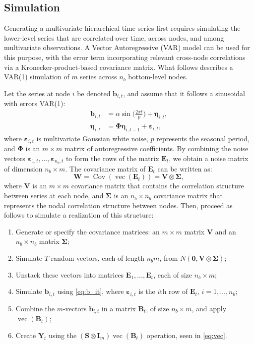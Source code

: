 \documentclass[a4paper,preprint,11pt,authoryear]{elsarticle}
\DeclareMathOperator{\cov}{Cov}
\DeclareMathOperator{\vetor}{vec}
\DeclareMathOperator{\seno}{sin}
\begin{document}
\subsection{Simulation}
\label{sec3.1}
Generating a multivariate hierarchical time series first requires simulating the lower-level series that are correlated over time, across nodes, and among multivariate observations. A Vector Autoregressive (VAR) model can be used for this purpose, with the error term incorporating relevant cross-node correlations via a Kronecker-product-based covariance matrix. What follows describes a VAR(1) simulation of $m$ series across $n_b$ bottom-level nodes.

Let the series at node $i$ be denoted $\bm{b}_{i,t}$, and assume that it follows a sinusoidal with errors VAR(1):
\begin{equation}
  \begin{aligned}
    \bm{b}_{i,t} & = \alpha \seno\bigg(\frac{2\pi t}{p}\bigg) + \bm{\eta}_{i,t}, \\
    \bm{\eta}_{i,t} & = \bm{\Phi} \bm{\eta}_{i,t-1} + \bm{\varepsilon}_{i,t},
  \end{aligned}
  \label{eq:b_it}
\end{equation}
where $\bm{\varepsilon}_{i,t}$ is multivariate Gaussian white noise, $p$ represents the seasonal period, and $\bm{\Phi}$ is an $m \times m$ matrix of autoregressive coefficients. By combining the noise vectors $\bm{\varepsilon}_{1,t}, \dots, \bm{\varepsilon}_{n_b,t} $ to form the rows of the matrix $\bm{E}_t$, we obtain a noise matrix of dimension $n_b \times
m$. The covariance matrix of $\bm{E}_t$ can be written as:
\begin{equation*}
  \bm{W} = \cov(\vetor(\bm{E}_t)) = \bm{V} \otimes \bm{\Sigma},
\end{equation*}
where $\bm{V}$ is an $m \times m$ covariance matrix that contains the correlation structure between series at each node, and $\bm{\Sigma}$ is an $n_b \times n_b$ covariance matrix that represents the nodal correlation structure between nodes. Then, proceed as follows to simulate a realization of this structure:
\begin{enumerate}
  \item Generate or specify the covariance matrices: an $m \times m$ matrix $\bm{V}$ and an $n_b \times n_b$ matrix $\bm{\Sigma}$;
  \item Simulate $T$ random vectors, each of length $n_b m$, from $N(\bm{0}, \bm{V} \otimes \bm{\Sigma})$;
  \item Unstack these vectors into matrices $\bm{E}_1, \dots, \bm{E}_t$, each of size $n_b \times m$;
  \item Simulate $\bm{b}_{i,t}$ using \eqref{eq:b_it}, where $\bm{\varepsilon}_{i,t}$ is the $i$th row of $\bm{E}_t$, $i=1,\dots,n_b$;
  \item Combine the $m$-vectors $\bm{b}_{i,t}$ in a matrix $\bm{B}_t$, of size $n_b \times m$, and apply $\vetor(\bm{B}_t)$;
  \item Create $\bm{Y}_t$ using the $(\bm{S} \otimes \bm{I}_m)\vetor(\bm{B}_t)$ operation, seen in \eqref{eq:vec}.
\end{enumerate}
\end{document}

